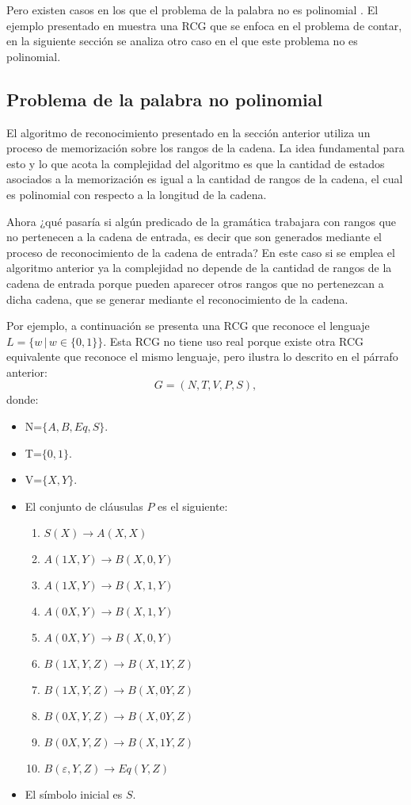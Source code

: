 Pero existen casos en los que el problema de la palabra no es polinomial \cite{propertiesRCGBib}.
El ejemplo presentado en \cite{propertiesRCGBib} muestra una RCG que se enfoca en el problema de contar,
en la siguiente sección se analiza otro caso en el que este problema no es polinomial.

\subsection{Problema de la palabra no polinomial}

El algoritmo de reconocimiento presentado en la sección anterior utiliza un proceso de memorización sobre los rangos de la cadena.
La idea fundamental para esto y lo que acota la complejidad del algoritmo es que la cantidad de estados
asociados a la memorización es igual a la cantidad de rangos de la cadena, el cual es polinomial con respecto
a la longitud de la cadena.

Ahora ¿qué pasaría si algún predicado de la gramática trabajara con rangos que no pertenecen a la cadena de entrada, es decir que son generados mediante
el proceso de reconocimiento de la cadena de entrada? En este caso si se emplea el algoritmo anterior ya la complejidad no depende de la cantidad de rangos de la cadena de entrada
porque pueden aparecer otros rangos que no pertenezcan a dicha cadena, que se generar mediante el reconocimiento de la cadena.

Por ejemplo, a continuación se presenta una RCG que reconoce el lenguaje $L=\{w\,|\,w\in\{0,1\}\}$. Esta RCG no tiene uso real porque existe otra RCG equivalente que reconoce el
mismo lenguaje, pero ilustra lo descrito en el párrafo anterior:
\[
    G = (N, T, V, P, S),
\]
donde:

\begin{itemize}
    \item  N=$\{A,B,Eq,S\}$.
    \item T=$\{0,1\}$.
    \item V=$\{X,Y\}$.
    \item El conjunto de cláusulas $P$ es el siguiente:
          \begin{enumerate}
              \item $S(X)\to A(X,X)$
              \item $A(1X,Y)\to B(X,0,Y)$
              \item $A(1X,Y)\to B(X,1,Y)$
              \item $A(0X,Y)\to B(X,1,Y)$
              \item $A(0X,Y)\to B(X,0,Y)$
              \item $B(1X,Y,Z)\to B(X,1Y,Z)$
              \item $B(1X,Y,Z)\to B(X,0Y,Z)$
              \item $B(0X,Y,Z)\to B(X,0Y,Z)$
              \item $B(0X,Y,Z)\to B(X,1Y,Z)$
              \item $B(\varepsilon,Y,Z)\to Eq(Y,Z)$
          \end{enumerate}

    \item El símbolo inicial es $S$.
\end{itemize}

